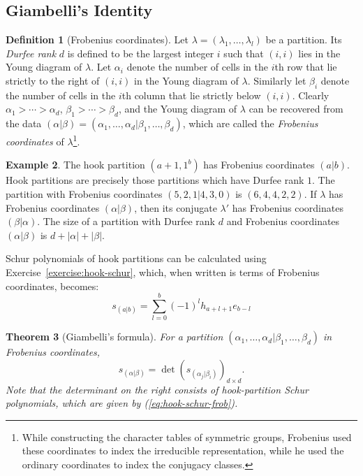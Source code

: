 \documentclass[11pt]{amsproc}
\newtheorem{theorem}{Theorem}[subsection]
\theoremstyle{definition}
\newtheorem{definition}[theorem]{Definition}
\theoremstyle{example}
\newtheorem{example}[theorem]{Example}
\begin{document}
\subsection{Giambelli's Identity}
\label{sec:giambelli}
\begin{definition}
  [Frobenius coordinates]
  Let $\lambda=(\lambda_1,\dotsc,\lambda_l)$ be a partition.
  Its \emph{Durfee rank} $d$ is defined to be the largest integer $i$ such that $(i,i)$ lies in the Young diagram of $\lambda$.
  Let $\alpha_i$ denote the number of cells in the $i$th row that lie strictly to the right of $(i,i)$ in the Young diagram of $\lambda$.
  Similarly let $\beta_i$ denote the number of cells in the $i$th column that lie strictly below $(i,i)$.
  Clearly $\alpha_1>\dotsb>\alpha_d$, $\beta_1>\dotsb>\beta_d$, and the Young diagram of $\lambda$ can be recovered from the data $(\alpha|\beta)=(\alpha_1,\dotsc,\alpha_d|\beta_1,\dotsc,\beta_d)$, which are called the \emph{Frobenius coordinates} of $\lambda$\footnote{While constructing the character tables of symmetric groups, Frobenius used these coordinates to index the irreducible representation, while he used the ordinary coordinates to index the conjugacy classes.}.
\end{definition}
\begin{example}
  The hook partition $(a+1,1^b)$ has Frobenius coordinates $(a|b)$.
  Hook partitions are precisely those partitions which have Durfee rank $1$.
  The partition with Frobenius coordinates $(5,2,1|4,3,0)$ is $(6,4,4,2,2)$.
  If $\lambda$ has Frobenius coordinates $(\alpha|\beta)$, then its conjugate $\lambda'$ has Frobenius coordinates $(\beta|\alpha)$.
  The size of a partition with Durfee rank $d$ and Frobenius coordinates $(\alpha|\beta)$ is $d+|\alpha|+|\beta|$. 
\end{example}
Schur polynomials of hook partitions can be calculated using Exercise~\ref{exercise:hook-schur}, which, when written is terms of Frobenius coordinates, becomes:
\begin{equation}
  \label{eq:hook-schur-frob}
  s_{(a|b)} = \sum_{l=0}^b (-1)^l h_{a+l+1}e_{b-l}
\end{equation}
\begin{theorem}
  [Giambelli's formula]
  For a partition $(\alpha_1,\dotsc,\alpha_d|\beta_1,\dotsc,\beta_d)$  in Frobenius coordinates,
  \begin{equation}
    \label{eq:giambelli}
    s_{(\alpha|\beta)} = \det(s_{(\alpha_j|\beta_i)})_{d\times d}.
  \end{equation}
  Note that the determinant on the right consists of hook-partition Schur polynomials, which are given by \textup{(\ref{eq:hook-schur-frob})}.
\end{theorem}
\end{document}
